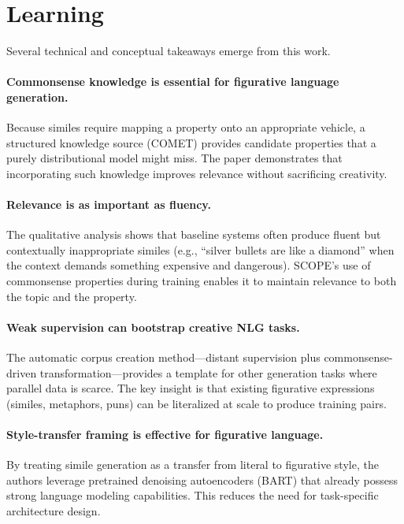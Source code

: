\documentclass[12pt]{article}
\begin{document}
\section{Learning}

Several technical and conceptual takeaways emerge from this work.

\paragraph{Commonsense knowledge is essential for figurative language generation.} Because similes require mapping a property onto an appropriate vehicle, a structured knowledge source (COMET) provides candidate properties that a purely distributional model might miss. The paper demonstrates that incorporating such knowledge improves relevance without sacrificing creativity.

\paragraph{Relevance is as important as fluency.} The qualitative analysis shows that baseline systems often produce fluent but contextually inappropriate similes (e.g., ``silver bullets are like a diamond'' when the context demands something expensive and dangerous). SCOPE's use of commonsense properties during training enables it to maintain relevance to both the topic and the property.

\paragraph{Weak supervision can bootstrap creative NLG tasks.} The automatic corpus creation method---distant supervision plus commonsense-driven transformation---provides a template for other generation tasks where parallel data is scarce. The key insight is that existing figurative expressions (similes, metaphors, puns) can be literalized at scale to produce training pairs.

\paragraph{Style-transfer framing is effective for figurative language.} By treating simile generation as a transfer from literal to figurative style, the authors leverage pretrained denoising autoencoders (BART) that already possess strong language modeling capabilities. This reduces the need for task-specific architecture design.
\end{document}
